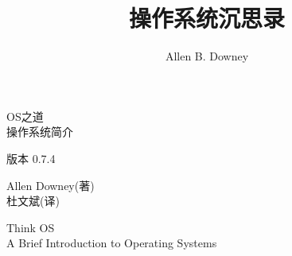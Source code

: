\documentclass[12pt]{book}
\title{操作系统沉思录}
\author{Allen B. Downey}
\newcommand{\enthetitle}{Think OS}
\newcommand{\enthesubtitle}{A Brief Introduction to Operating Systems}
\newcommand{\thetitle}{OS之道}
\newcommand{\thesubtitle}{操作系统简介}
\newcommand{\theversion}{0.7.4}
\begin{document}
\frontmatter



  {\topsep}%
  {\topsep}%
  {}%
  {}%
  {\bfseries}%
  {}%
  { }%
  {}%

\theoremstyle{exercise}
\newtheorem{exercise}{Exercise}[chapter]



\begin{latexonly}

\renewcommand{\topfraction}{0.9}
\renewcommand{\blankpage}{\thispagestyle{empty} \quad \newpage}


\thispagestyle{empty}

\begin{flushright}
\vspace*{2.0in}

\begin{spacing}{3}
{\huge \thetitle}\\
{\Large \thesubtitle}
\end{spacing}

\vspace{0.25in}

版本 \theversion

\vspace{1in}

{\Large
	Allen Downey(著)\\
}
{\small 杜文斌(译)}


\vfill

\end{flushright}


\blankpage
\blankpage

\pagebreak
\thispagestyle{empty}

\begin{flushright}
\vspace*{2.0in}

\begin{spacing}{3}
{\huge \enthetitle}\\
{\Large \enthesubtitle}
\end{spacing}


\end{flushright}
\end{latexonly}
\end{document}
